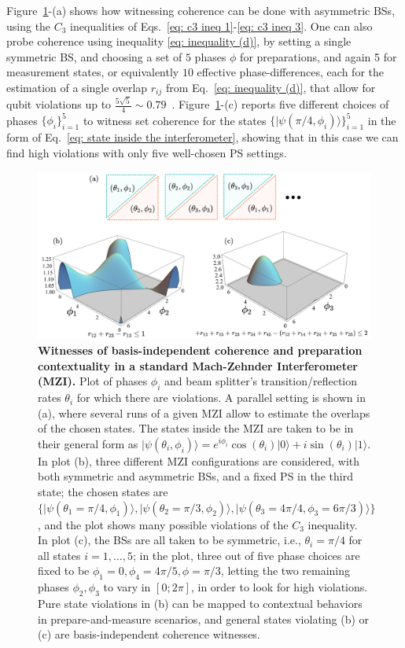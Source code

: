 \documentclass[a4paper,twocolumn,11pt,accepted=2024-01-17]{quantumarticle}
\begin{document}
Figure~\ref{fig:violation}-(a) shows how witnessing coherence can be done with asymmetric BSs, using the $C_3$ inequalities of Eqs.~\eqref{eq: c3 ineq 1}-\eqref{eq: c3 ineq 3}. One can also probe coherence using inequality \eqref{eq: inequality (d)}, by setting a single symmetric BS, and choosing a  set of $5$ phases $\phi$ { for preparations, and again 5 for measurement states}, or equivalently $10$ effective phase-differences, { each for the estimation of a single overlap $r_{ij}$ from Eq.~\eqref{eq: inequality (d)},} that allow for qubit violations up to $\frac{5\sqrt{5}}{4}\sim 0.79$~\cite{wagner2022inequalities}. Figure~\ref{fig:violation}-(c) reports five different choices of phases $\{\phi_i\}_{i=1}^5$ to witness set coherence for the states $\{\vert \psi(\pi/4,\phi_i)\rangle \}_{i=1}^5$ in the form of Eq.~\eqref{eq: state inside the interferometer}, showing that in this case we can find high violations with only five well-chosen PS settings.
\begin{figure}[htb]
    \includegraphics[width=1\textwidth]{Acc_Figures/ViolationsFirstFigure.png}
    \caption{\textbf{Witnesses of basis-independent coherence and preparation contextuality in a standard Mach-Zehnder Interferometer (MZI).} Plot of phases $\phi_i$ and beam splitter's transition/reflection rates $\theta_i$ for which there are violations. A parallel setting is shown in (a),  where several runs of a given MZI allow to estimate the overlaps of the chosen states. The states inside the MZI are taken to be in their general form as $\vert \psi(\theta_i,\phi_i) \rangle = e^{i\phi_i}\cos(\theta_i)\vert 0 \rangle + i \sin(\theta_i)\vert 1 \rangle$. In plot (b), three different MZI configurations are considered, with both symmetric and asymmetric BSs, and a fixed PS in the third state; the chosen states are $\{\vert \psi(\theta_1 = \pi/4,\phi_1)\rangle , \vert \psi(\theta_2 = \pi/3,\phi_2)\rangle , \vert \psi(\theta_3 = 4\pi/4,\phi_3 = 6\pi/3) \rangle \}$, and the plot shows many possible violations of the $C_3$ inequality. In plot (c), the BSs are all taken to be symmetric, i.e., $\theta_i = \pi/4$ for all states $i=1,\dots,5$; in the plot, three out of five phase choices are fixed to be $\phi_1=0, \phi_4=4\pi/5, \phi = \pi/3$, letting the two remaining phases $\phi_2,\phi_3$ to vary in $[0; 2\pi]$, in order to look for high violations. Pure state violations in (b) can be mapped to contextual behaviors in prepare-and-measure scenarios, and general states violating (b) or (c) are basis-independent coherence witnesses.}  
    \label{fig:violation}
\end{figure}
\end{document}
